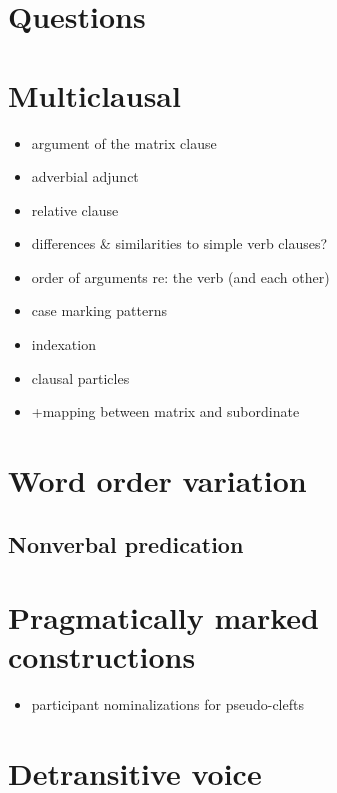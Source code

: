 \documentclass{memoir}
\begin{document}
\chapter{\texorpdfstring{Questions \label{questions}}{Questions }}

\chapter{\texorpdfstring{Multiclausal
\label{multiclausal}}{Multiclausal }}

\begin{itemize}
\item
  argument of the matrix clause
\item
  adverbial adjunct
\item
  relative clause
\item
  differences \& similarities to simple verb clauses?
\item
  order of arguments re: the verb (and each other)
\item
  case marking patterns
\item
  indexation
\item
  clausal particles
\item
  +mapping between matrix and subordinate
\end{itemize}

\chapter{\texorpdfstring{Word order variation
\label{wordorder}}{Word order variation }}

\section{\texorpdfstring{Nonverbal predication
\label{nvp-order}}{Nonverbal predication }}

\chapter{\texorpdfstring{Pragmatically marked constructions
\label{pragmarked}}{Pragmatically marked constructions }}

\begin{itemize}
\tightlist
\item
  participant nominalizations for pseudo-clefts
\end{itemize}

\chapter{\texorpdfstring{Detransitive voice
\label{voice}}{Detransitive voice }}
\end{document}
